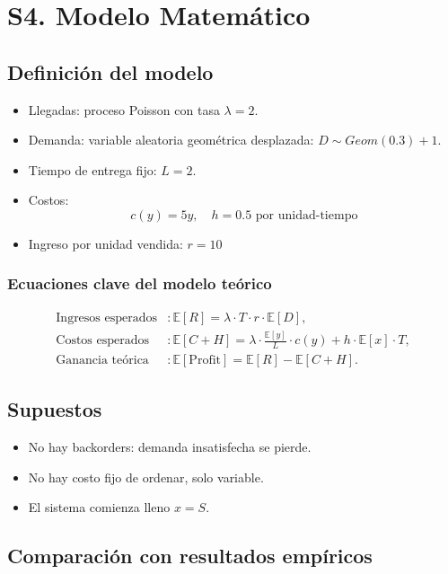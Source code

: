 \documentclass{report}
\begin{document}
\section*{S4. Modelo Matemático}

\subsection*{Definición del modelo}

\begin{itemize}
\item Llegadas: proceso Poisson con tasa \(\lambda = 2\).
\item Demanda: variable aleatoria geométrica desplazada: \(D \sim Geom(0.3)+1\).
\item Tiempo de entrega fijo: \(L = 2\).
\item Costos:
  \[ c(y) = 5y, \quad h = 0.5 \text{ por unidad-tiempo} \]
\item Ingreso por unidad vendida: \(r = 10\)
\end{itemize}

\subsubsection*{Ecuaciones clave del modelo teórico}
\begin{align*}
    \text{Ingresos esperados} &: \mathbb{E}[R] = \lambda \cdot T \cdot r \cdot \mathbb{E}[D], \\
    \text{Costos esperados} &: \mathbb{E}[C + H] = \lambda \cdot \frac{\mathbb{E}[y]}{L} \cdot c(y) + h \cdot \mathbb{E}[x] \cdot T, \\
    \text{Ganancia teórica} &: \mathbb{E}[\text{Profit}] = \mathbb{E}[R] - \mathbb{E}[C + H].
\end{align*}

\subsection*{Supuestos}

\begin{itemize}
\item No hay backorders: demanda insatisfecha se pierde.
\item No hay costo fijo de ordenar, solo variable.
\item El sistema comienza lleno \(x = S\).
\end{itemize}

\subsection*{Comparación con resultados empíricos}
\end{document}
